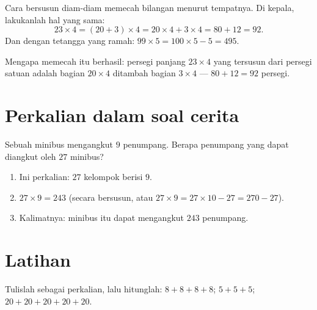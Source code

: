 \begin{example}\label{ex:g3:mult:split}
Cara bersusun diam-diam memecah bilangan menurut tempatnya. Di
kepala, lakukanlah hal yang sama:
\[
23 \times 4 = (20 + 3) \times 4 = 20 \times 4 + 3 \times 4
= 80 + 12 = 92 .
\]
Dan dengan tetangga yang ramah: $99 \times 5 = 100 \times 5 - 5 =
495$.
\end{example}

\begin{omfigure}

{\small Mengapa memecah itu berhasil: persegi panjang $23 \times 4$
yang tersusun dari persegi satuan adalah bagian $20 \times 4$
ditambah bagian $3 \times 4$ --- $80 + 12 = 92$ persegi.}
\end{omfigure}

\section{Perkalian dalam soal cerita}

\begin{example}\label{ex:g3:mult:problem}
Sebuah minibus mengangkut $9$ penumpang. Berapa penumpang yang dapat
diangkut oleh $27$ minibus?
\begin{enumerate}
  \item Ini perkalian: $27$ kelompok berisi $9$.
  \item $27 \times 9 = 243$ (secara bersusun, atau
        $27 \times 9 = 27 \times 10 - 27 = 270 - 27$).
  \item Kalimatnya: minibus itu dapat mengangkut $243$ penumpang.
\end{enumerate}
\end{example}

\section{Latihan}

\begin{exercise}[$\star$]\label{exo:g3:mult:1}
Tulislah sebagai perkalian, lalu hitunglah:
$8 + 8 + 8 + 8$; \quad $5 + 5 + 5$; \quad
$20 + 20 + 20 + 20 + 20$.
\end{exercise}

